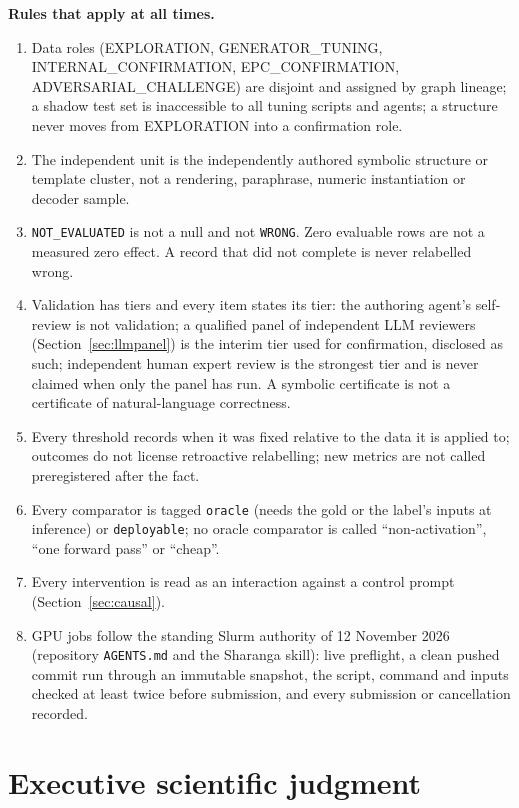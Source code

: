 \documentclass[10pt,a4paper]{article}
\newcommand{\NE}{\texttt{NOT\_EVALUATED}}
\begin{document}
\textbf{Rules that apply at all times.}
\begin{enumerate}
\item Data roles (EXPLORATION, GENERATOR\_TUNING, INTERNAL\_CONFIRMATION, EPC\_CONFIRMATION,
ADVERSARIAL\_CHALLENGE) are disjoint and assigned by graph lineage; a shadow test set is inaccessible to all
tuning scripts and agents; a structure never moves from EXPLORATION into a confirmation role.
\item The independent unit is the independently authored symbolic structure or template cluster, not a rendering,
paraphrase, numeric instantiation or decoder sample.
\item \NE{} is not a null and not \texttt{WRONG}. Zero evaluable rows are not a measured zero effect. A record
that did not complete is never relabelled wrong.
\item Validation has tiers and every item states its tier: the authoring agent's self-review is not validation;
a qualified panel of independent LLM reviewers (Section~\ref{sec:llmpanel}) is the interim tier used for
confirmation, disclosed as such; independent human expert review is the strongest tier and is never claimed when
only the panel has run. A symbolic certificate is not a certificate of natural-language correctness.
\item Every threshold records when it was fixed relative to the data it is applied to; outcomes do not license
retroactive relabelling; new metrics are not called preregistered after the fact.
\item Every comparator is tagged \texttt{oracle} (needs the gold or the label's inputs at inference) or
\texttt{deployable}; no oracle comparator is called ``non-activation'', ``one forward pass'' or ``cheap''.
\item Every intervention is read as an interaction against a control prompt (Section~\ref{sec:causal}).
\item GPU jobs follow the standing Slurm authority of 12 November 2026 (repository \texttt{AGENTS.md} and the
Sharanga skill): live preflight, a clean pushed commit run through an immutable snapshot, the script, command and
inputs checked at least twice before submission, and every submission or cancellation recorded.
\end{enumerate}

\section{Executive scientific judgment}
\label{sec:judgment}
\end{document}
